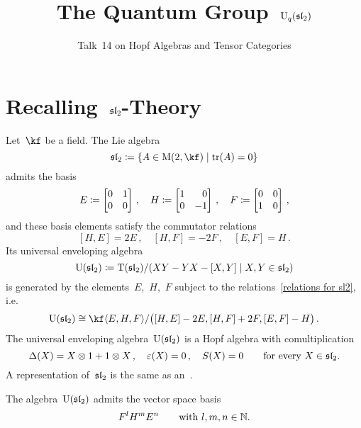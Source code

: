 \documentclass[a4paper, 11pt, oneside]{scrartcl}
\title{The Quantum Group~$\operatorname{U}_q(\mathfrak{sl}_2)$}
\subtitle{Talk~14 on Hopf Algebras and Tensor Categories}
\author{}
\date{}
\begin{document}
\maketitle

\vspace{-4em}





\section{Recalling~\texorpdfstring{$\mathfrak{sl}_2$}{sl2}-Theory}

Let~$\kf$ be a field.
The Lie algebra
\[
  \sllie_2
  \defined
  \{
    A \in \Mat(2, \kf)
  \suchthat
    \tr(A) = 0
  \}
\]
admits the basis
\[
  E
  \defined
  \begin{bmatrix}
    0 & 1 \\
    0 & 0
  \end{bmatrix} \,,
  \quad
  H
  \defined
  \begin{bmatrix*}[r]
    1 &  0 \\
    0 & -1
  \end{bmatrix*} \,,
  \quad
  F
  \defined
  \begin{bmatrix}
    0 & 0 \\
    1 & 0
  \end{bmatrix} \,,
\]
and these basis elements satisfy the commutator relations
\begin{equation}
  \label{relations for sl2}
  [H, E] = 2E \,,
  \quad
  [H, F] = -2F \,,
  \quad
  [E, F] = H \,.
\end{equation}
Its universal enveloping algebra
\[
  \Univ(\sllie_2)
  \defined
  \Tensor(\sllie_2)
  /
  \genideal{ XY - YX - [X,Y] \suchthat X, Y \in \sllie_2 }
\]
is generated by the elements~$E$,~$H$,~$F$ subject to the relations~\eqref{relations for sl2}, i.e.
\[
  \Univ(\sllie_2)
  \cong
  \kf\gen{E, H, F}
  /
  \genideal[\big]{[H,E] - 2E, [H,F] + 2F, [E,F] - H} \,.
\]
The universal enveloping algebra~$\operatorname{U}(\mathfrak{sl}_2)$ is a Hopf algebra with comultiplication
\[
  \Delta(X) = X \otimes 1 + 1 \otimes X \,,
  \quad
  \varepsilon(X) = 0 \,,
  \quad
  S(X) = 0
  \qquad
  \text{for every~$X \in \mathfrak{sl}_2$}.
\]
A representation of~$\mathfrak{sl}_2$ is the same as an~.

\begin{theorem}
  The algebra~$\operatorname{U}(\mathfrak{sl}_2)$ admits the vector space basis
  \[
    F^l H^m E^n
    \qquad
    \text{with~$l, m, n \in \mathbb{N}$.}
  \]
\end{theorem}
\end{document}
